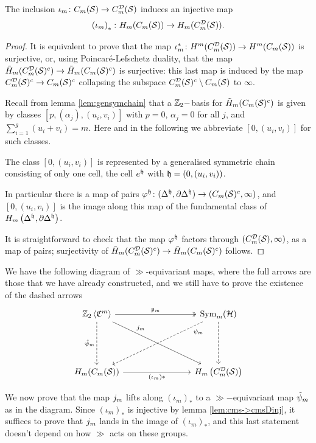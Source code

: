 \begin{lem}
 \label{lem:cms->cmsDinj}
 The inclusion $\iota_m\colon C_m(\mathcal{S})\to C_{m}^{\mathcal{D}}(\mathcal{S})$ induces an injective map
 \[
  \left(\iota_m\right)_*\colon H_m(C_m(\mathcal{S}))\to H_m(C_{m}^{\mathcal{D}}(\mathcal{S})).
 \]
\end{lem}
\begin{proof}
 It is equivalent to prove that the map $\iota_m^*\colon H^m(C_{m}^{\mathcal{D}}(\mathcal{S}))\to H^m(C_m(\mathcal{S}))$ is surjective,
 or, using Poincaré-Lefschetz duality, that the map $\tilde{H}_m(C_{m}^{\mathcal{D}}(\mathcal{S})^c)\to \tilde{H}_m(C_m(\mathcal{S})^c)$
 is surjective: this last map is induced by the map $C_{m}^{\mathcal{D}}(\mathcal{S})^c\to C_m(\mathcal{S})^c$ collapsing the subspace
 $C_{m}^{\mathcal{D}}(\mathcal{S})^c\setminus C_m(\mathcal{S})$ to $\infty$.
 
 Recall from lemma \ref{lem:gensymchain} that a $\mathbb{Z}_2-$basis for $\tilde{H}_m(C_m(\mathcal{S})^c)$
 is given by classes $[p,(\alpha_j),(u_i,v_i)]$ with $p=0$, $\alpha_j=0$ for all $j$,
 and $\sum_{i=1}^g (u_i+v_i)=m$. Here and in the following we abbreviate $[0,(u_i,v_i)]$ for
 such classes.
 
 The class $[0,(u_i,v_i)]$ is represented by a generalised symmetric chain consisting of only one cell,
 the cell $e^{\mathfrak{h}}$
 with $\mathfrak{h}=(0,(u_i,v_i))$.
 
 In particular there is a map of pairs
 $\varphi^{\mathfrak{h}}\colon(\Delta^{\mathfrak{h}},\partial\Delta^{\mathfrak{h}})\to (C_m(\mathcal{S})^c,\infty)$, and $[0,(u_i,v_i)]$
 is the image along this map of the fundamental class of $H_m\left(\Delta^{\mathfrak{h}},\partial\Delta^{\mathfrak{h}}\right)$.
 
 It is straightforward to check that the map $\varphi^{\mathfrak{h}}$ factors through
 $(C_{m}^{\mathcal{D}}(\mathcal{S}),\infty)$, as a map of pairs; surjectivity of $\tilde{H}_m(C_{m}^{\mathcal{D}}(\mathcal{S})^c)\to \tilde{H}_m(C_m(\mathcal{S})^c)$ follows.
\end{proof}

We have the following diagram of $\gg$-equivariant maps, where the full arrows are those
that we have already constructed, and we still have to prove the existence of the dashed arrows
\begin{equation}
\label{eq:fulldasheddiagram}
\begin{tikzcd}[column sep=8em,row sep=5em]
  \ZcC{m} \ar[r,"\pr_m",two heads]\ar[d,dashed, swap, "\tpsi_m"]\ar[dr,"\j_m",near start]
  & \Sym_m(\H)\ar[d,dashed ]\ar[dl,dashed,very near start,"\psi_m"]\\
  H_m(\cms)\ar[r,swap,"\pa{\iota_m}*"hook] & H_m\pa{\cmsD}
 \end{tikzcd}
\end{equation}

We now prove that the map $j_m$ lifts along $(\iota_m)_*$
to a $\gg-$equivariant map $\tilde\psi_m$ as in the diagram.
Since $(\iota_m)_*$ is injective by lemma \ref{lem:cms->cmsDinj}, it suffices to prove that $j_m$
lands in the image of $(\iota_m)_*$, and this last statement doesn't depend on how $\gg$ acts on these groups.

